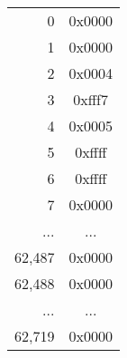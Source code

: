 \documentclass[border=1mm]{standalone}
\begin{document}
\ttfamily\small\begin{tabular}{ r | c |}\cline{2-2}
  0 & 0x0000 \\\cline{2-2}
  1 & 0x0000 \\\cline{2-2}
  2 & 0x0004 \\\cline{2-2}
  3 & 0xfff7 \\\cline{2-2}
  4 & 0x0005 \\\cline{2-2}
  5 & 0xffff \\\cline{2-2}
  6 & 0xffff \\\cline{2-2}
  7 & 0x0000 \\\cline{2-2}
  ... & ... \\\cline{2-2}
  62,487 & 0x0000 \\\cline{2-2}
  62,488 & 0x0000 \\\cline{2-2}
  ... & ... \\\cline{2-2}
  62,719 & 0x0000 \\\cline{2-2}
\end{tabular}
\end{document}
